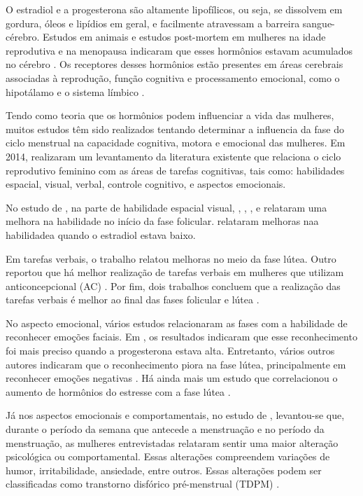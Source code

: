 O estradiol e a progesterona são altamente lipofílicos, ou seja, se dissolvem em gordura, óleos e 
lipídios em geral, e facilmente atravessam a barreira sangue-cérebro. Estudos em animais e estudos 
post-mortem em mulheres na idade reprodutiva e na menopausa indicaram que esses hormônios estavam 
acumulados no cérebro \cite{bixo1997}. Os receptores desses hormônios estão presentes em áreas 
cerebrais associadas à reprodução, função cognitiva e processamento emocional, como o hipotálamo e o 
sistema límbico \cite{gruber2002, brinton2008}.


Tendo como teoria que os hormônios podem influenciar a vida das mulheres, muitos estudos têm sido 
realizados tentando determinar a influencia da fase do ciclo menstrual na capacidade cognitiva, 
motora e emocional das mulheres. Em 2014,  realizaram um levantamento da 
literatura existente que relaciona o ciclo reprodutivo feminino com as áreas de tarefas cognitivas, 
tais como: habilidades espacial, visual, verbal, controle cognitivo, e aspectos emocionais.


No estudo de , na parte de habilidade espacial visual, 
, , ,  e  
relataram uma melhora 
na habilidade no início da fase folicular.  relataram melhoras naa habilidadea quando o 
estradiol estava baixo. 


Em tarefas verbais, o trabalho \cite{maki2002} relatou melhoras no meio da fase lútea. Outro 
reportou que há melhor realização de tarefas verbais em mulheres que utilizam anticoncepcional (AC) 
\cite{mordecai2008}. Por fim, dois trabalhos concluem que a realização das tarefas verbais é melhor 
ao final das fases folicular e lútea \cite{Rosenberg2002, solis2004}.


No aspecto emocional, vários estudos relacionaram as fases com a habilidade de reconhecer emoções 
faciais. Em , os resultados indicaram que esse reconhecimento foi mais 
preciso quando a progesterona estava alta. Entretanto, vários outros autores indicaram que o 
reconhecimento piora na fase lútea, principalmente em reconhecer emoções negativas \cite{gasbarri2008}.
Há ainda mais um estudo que correlacionou o aumento de hormônios do estresse com a fase lútea \cite{kirschbaum1999}.



Já nos aspectos emocionais e comportamentais, no estudo de , levantou-se que, 
durante o período da semana que antecede a menstruação e no período da menstruação, as mulheres 
entrevistadas relataram sentir uma maior alteração psicológica ou comportamental. Essas alterações 
compreendem variações de humor, irritabilidade, ansiedade, entre outros. Essas alterações podem ser 
classificadas como transtorno disfórico pré-menstrual (TDPM) \cite{ACOG2000}.

